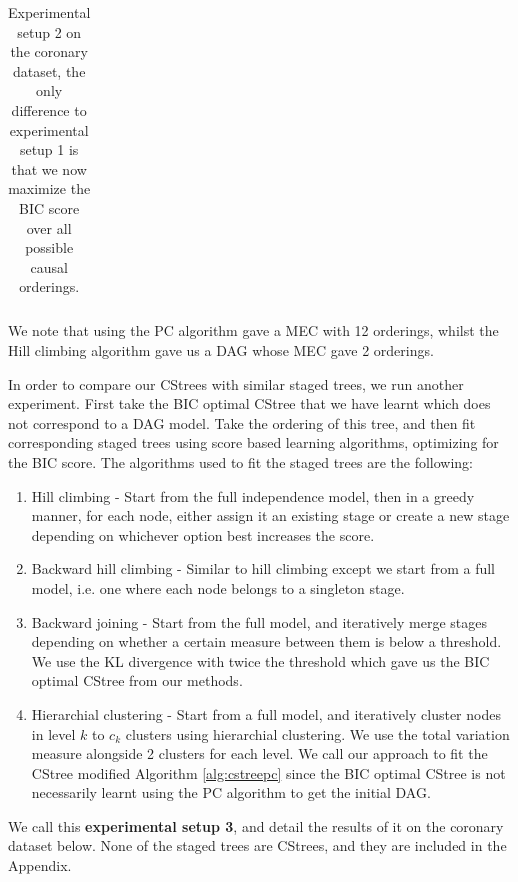 \documentclass{tufte-book}
\begin{document}
\begin{Definition}
\begin{table}[]
\begin{tabular}{cccccccccccccccc}
\caption{Experimental setup 2 on the coronary dataset, the only difference to experimental setup 1 is that we now maximize the BIC score over all possible causal orderings.}
			\end{tabular}
\end{table}

We note that using the PC algorithm gave a MEC with 12 orderings, whilst the Hill climbing algorithm gave us a DAG whose MEC gave 2 orderings.



In order to compare our CStrees with similar staged trees, we run another experiment. First take the BIC optimal CStree that we have learnt which does not correspond to a DAG model. Take the ordering of this tree, and then fit corresponding staged trees using score based learning algorithms, optimizing for the BIC score. The algorithms used to fit the staged trees are the following:
\begin{enumerate}
\item Hill climbing - Start from the full independence model, then in a greedy manner, for each node, either assign it an existing stage or create a new stage depending on whichever option best increases the score.
\item Backward hill climbing - Similar to hill climbing except we start from a full model, i.e. one where each node belongs to a singleton stage.
\item Backward joining - Start from the full model, and iteratively merge stages depending on whether a certain measure between them is below a threshold. We use the KL divergence with twice the threshold which gave us the BIC optimal CStree from our methods.
\item Hierarchial clustering - Start from a full model, and iteratively cluster nodes in level \(k\) to \(c_k\) clusters using hierarchial clustering. We use the total variation measure alongside 2 clusters for each level.
We call our approach to fit the CStree modified Algorithm \ref{alg:cstreepc} since the BIC optimal CStree is not necessarily learnt using the PC algorithm to get the initial DAG.
\end{enumerate}

We call this \textbf{experimental setup 3}, and detail the results of it on the coronary dataset below. None of the staged trees are CStrees, and they are included in the Appendix.



\end{Definition}
\end{document}
